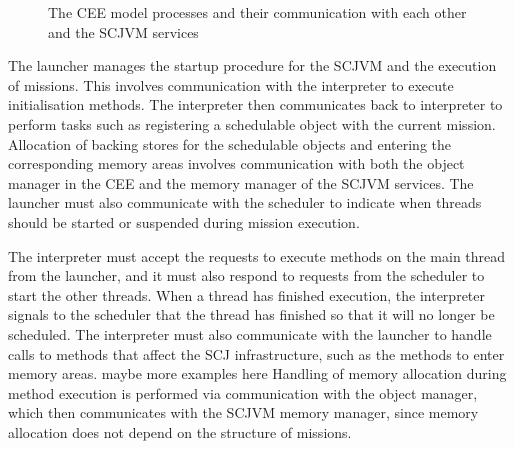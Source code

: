 \begin{figure}[ht]
  \centering
  \caption{The CEE model processes and their communication with each
    other and the SCJVM services}
  \label{cee-model-fig}
\end{figure}

The launcher manages the startup procedure for the SCJVM and the
execution of missions.
This involves communication with the interpreter to execute
initialisation methods.
The interpreter then communicates back to interpreter to perform tasks
such as registering a schedulable object with the current mission.
Allocation of backing stores for the schedulable objects and entering
the corresponding memory areas involves communication with both the
object manager in the CEE and the memory manager of the SCJVM
services.
The launcher must also communicate with the scheduler to indicate when
threads should be started or suspended during mission execution.

The interpreter must accept the requests to execute methods on the
main thread from the launcher, and it must also respond to requests
from the scheduler to start the other threads.
When a thread has finished execution, the interpreter signals to the
scheduler that the thread has finished so that it will no longer be
scheduled.
The interpreter must also communicate with the launcher to handle
calls to methods that affect the SCJ infrastructure, such as the
methods to enter memory areas.
maybe more examples here Handling of memory allocation during method
execution is performed via communication with the object manager,
which then communicates with the SCJVM memory manager, since memory
allocation does not depend on the structure of missions.

